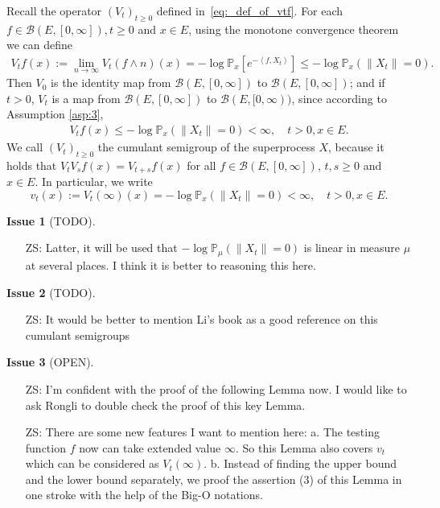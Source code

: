 \documentclass[12pt,a4paper]{amsart}
\numberwithin{equation}{section}
\theoremstyle{plain}
\theoremstyle{definition}
\newtheorem{iss}{Issue}
\begin{document}
Recall the operator $(V_t)_{t\geq 0}$ defined in~\eqref{eq:_def_of_vtf}.
For each $f\in \mathcal B(E, [0,\infty]),t\geq 0$ and $x\in E$, using the monotone convergence theorem we can define
\begin{align}
\label{eq:Vtf_is_finite}
  V_tf(x)
  := \lim_{n\to \infty}V_t(f\wedge n)(x)
  = - \log \mathbb P_x[e^{-\left\langle f, X_t \right\rangle}]
  \leq -\log \mathbb P_x(\|X_t\| = 0).
\end{align}
Then $V_0$ is the identity map from $\mathcal B(E,[0,\infty])$ to $\mathcal B(E,[0,\infty])$; and if $t > 0$, $V_t$ is a map from $\mathcal B(E,[0,\infty])$ to $\mathcal B(E, [0,\infty))$, since according to Assumption \ref{asp:3},
\begin{align}
V_tf(x) \leq - \log \mathbb P_x(\|X_t\| = 0 ) < \infty, 
\quad t >0, x\in E.
\end{align}
We call $(V_t)_{t\geq 0}$ the cumulant semigroup of the superprocess $X$, because it holds that $V_tV_sf(x) = V_{t+s}f(x)$ for all $f\in \mathcal B(E,[0,\infty])$, $t,s \geq 0$ and $x\in E$. 
In particular, we write
\[
	v_t(x):= V_t(\infty)(x)= -\log \mathbb P_x(\| X_t\| = 0) < \infty,
  \quad t > 0, x\in E.
\]
\begin{iss}[TODO]~
  \begin{itemize}
  \item[ZS:]
Latter, it will be used that $-\log \mathbb P_\mu(\|X_t\| = 0)$ is linear in measure $\mu$ at several places.
I think it is better to reasoning this here.
  \end{itemize}
\end{iss}
\begin{iss}[TODO]~
  \begin{itemize}
  \item[ZS:]
It would be better to mention Li's book as a good reference on this cumulant semigroups
  \end{itemize}
\end{iss}
\begin{iss}[OPEN]~
  \begin{itemize}
  \item[ZS:]
I'm confident with the proof of the following Lemma now. 
I would like to ask Rongli to double check the proof of this key Lemma.
\item[ZS:]
There are some new features I want to mention here:
a. The testing function $f$ now can take extended value $\infty$. So this Lemma also covers $v_t$ which can be considered as $V_t(\infty)$.
b. Instead of finding the upper bound and the lower bound separately, we proof the assertion (3) of this Lemma in one stroke with the help of the Big-O notations. 
  \end{itemize}
\end{iss}
\end{document}
